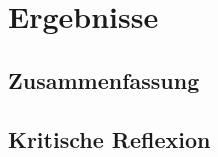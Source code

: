 
\chapter{Ergebnisse}
\label{ch:Evaluation}

\section{Zusammenfassung}

\section{Kritische Reflexion}

